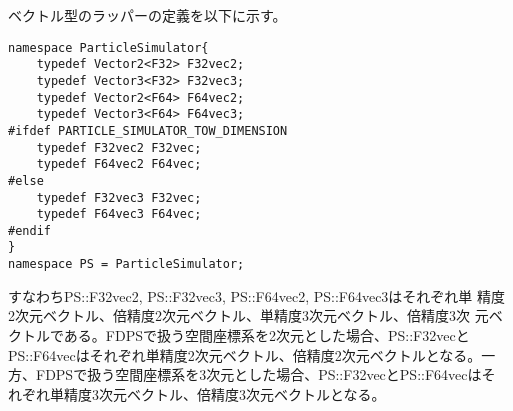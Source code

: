 ベクトル型のラッパーの定義を以下に示す。
\begin{lstlisting}[caption=vectorwrapper]
namespace ParticleSimulator{
    typedef Vector2<F32> F32vec2;
    typedef Vector3<F32> F32vec3;
    typedef Vector2<F64> F64vec2;
    typedef Vector3<F64> F64vec3;
#ifdef PARTICLE_SIMULATOR_TOW_DIMENSION
    typedef F32vec2 F32vec;
    typedef F64vec2 F64vec;
#else
    typedef F32vec3 F32vec;
    typedef F64vec3 F64vec;
#endif
}
namespace PS = ParticleSimulator;
\end{lstlisting}

すなわちPS::F32vec2, PS::F32vec3, PS::F64vec2, PS::F64vec3はそれぞれ単
精度2次元ベクトル、倍精度2次元ベクトル、単精度3次元ベクトル、倍精度3次
元ベクトルである。FDPSで扱う空間座標系を2次元とした場合、PS::F32vecと
PS::F64vecはそれぞれ単精度2次元ベクトル、倍精度2次元ベクトルとなる。一
方、FDPSで扱う空間座標系を3次元とした場合、PS::F32vecとPS::F64vecはそ
れぞれ単精度3次元ベクトル、倍精度3次元ベクトルとなる。

